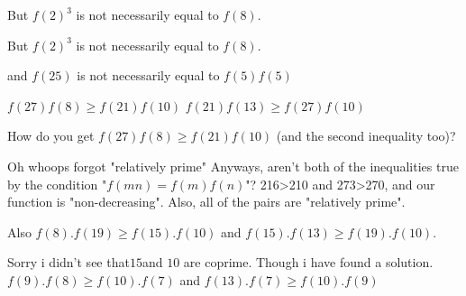 \begin{solution}
	But $f(2)^3$ is not necessarily equal to $f(8)$.
\end{solution}



\begin{solution}
	\begin{tcolorbox}But $f(2)^3$ is not necessarily equal to $f(8)$.\end{tcolorbox}
and $f(25)$ is not necessarily equal to $f(5)f(5)$
\end{solution}



\begin{solution}
	$f(27)f(8) \ge f(21)f(10)$
$f(21)f(13) \ge f(27)f(10)$
\end{solution}



\begin{solution}
	How do you get $f(27)f(8) \ge f(21)f(10)$ (and the second inequality too)?
\end{solution}



\begin{solution}
	Oh whoops forgot "relatively prime"
Anyways, aren't both of the inequalities true by the condition "$f(mn) = f(m)f(n)$"?  216>210 and 273>270, and our function is "non-decreasing".  Also, all of the pairs are "relatively prime".
\end{solution}



\begin{solution}
	Also $f(8).f(19) \ge f(15).f(10)$
and $f(15).f(13)\ge f(19).f(10) $.
\end{solution}



\begin{solution}
	Sorry i didn't see that$15$and $10$ are coprime. Though i have found a solution.
$f(9).f(8) \ge f(10).f(7) $ and $f(13).f(7) \ge f(10).f(9) $
\end{solution}



